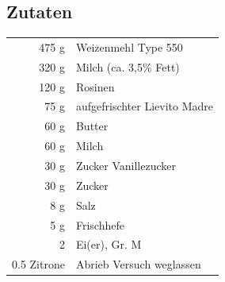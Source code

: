 %
%
\subsection*{Zutaten}
\begin{tabular}{r l}
          475 g & Weizenmehl Type 550          \\
          320 g & Milch (ca. 3,5\% Fett)       \\
          120 g & Rosinen                      \\
           75 g & aufgefrischter Lievito Madre \\
           60 g & Butter                       \\
           60 g & Milch                        \\
           30 g & Zucker Vanillezucker         \\
           30 g & Zucker                       \\
            8 g & Salz                         \\
            5 g & Frischhefe                   \\
              2 & Ei(er), Gr. M                \\
    0.5 Zitrone & Abrieb Versuch weglassen
\end{tabular}\\

%
%

